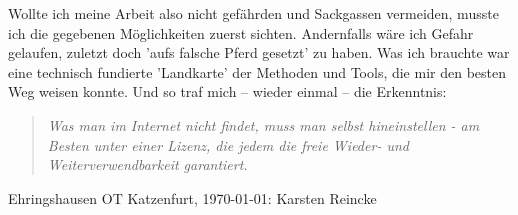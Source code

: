 Wollte ich meine Arbeit also nicht gefährden und Sackgassen vermeiden, musste ich die gegebenen Möglichkeiten zuerst sichten. Andernfalls wäre ich Gefahr gelaufen, zuletzt doch 'aufs falsche Pferd gesetzt' zu haben. Was ich brauchte war eine technisch fundierte 'Landkarte' der Methoden und Tools, die mir den besten Weg weisen konnte. Und so traf mich -- wieder einmal -- die Erkenntnis:

\begin{quote}\textit{Was man im Internet nicht findet, muss man selbst hineinstellen - am Besten unter einer Lizenz, die jedem die freie Wieder- und Weiterverwendbarkeit garantiert.} \end{quote}

\raggedleft Ehringshausen OT Katzenfurt, \today: Karsten Reincke

%
